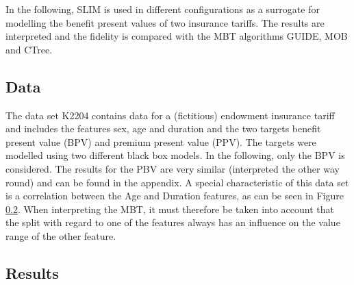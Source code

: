In the following, SLIM is used in different configurations as a surrogate for modelling the benefit present values of two insurance tariffs. The results are interpreted and the fidelity is compared with the MBT algorithms GUIDE, MOB and CTree.

\subsection{Data}
The data set K2204 contains data for a (fictitious) endowment insurance tariff and includes the features sex, age and duration and the two targets benefit present value (BPV) and premium present value (PPV). The targets were modelled using two different black box models.  
In the following, only the BPV is considered. The results for the PBV are very similar (interpreted the other way round) and can be found in the appendix. A special characteristic of this data set is a correlation between the Age and Duration features, as can be seen in Figure \ref{}. When interpreting the MBT, it must therefore be taken into account that the split with regard to one of the features always has an influence on the value range of the other feature.
 
\subsection{Results}